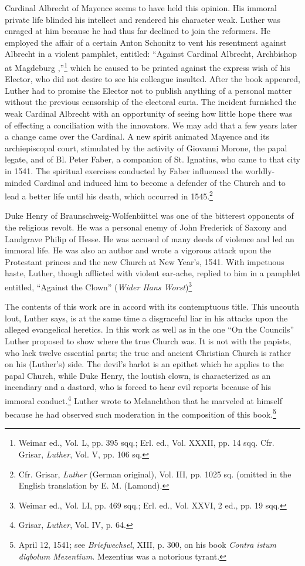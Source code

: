 Cardinal Albrecht of Mayence seems to have held this opinion.
His immoral private life blinded his intellect and rendered his character
weak. Luther was enraged at him because he had thus far declined
to join the reformers. He employed the affair of a certain
Anton Schonitz to vent his resentment against Albrecht in a violent
pamphlet, entitled: “Against Cardinal Albrecht, Archbishop at Magdeburg
,”\footnote
{Weimar ed., Vol. L, pp. 395 sqq.; Erl. ed., Vol. XXXII, pp. 14 sqq. Cfr. Grisar, \textit{Luther},
Vol. V, pp. 106 sq.}
which he caused to be printed against the express wish of
his Elector, who did not desire to see his colleague insulted. After the
book appeared, Luther had to promise the Elector not to publish anything
of a personal matter without the previous censorship of the
electoral curia. The incident furnished the weak Cardinal Albrecht
with an opportunity of seeing how little hope there was of effecting a
conciliation with the innovators. We may add that a few years later
a change came over the Cardinal. A new spirit animated Mayence and
its archiepiscopal court, stimulated by the activity of Giovanni Morone,
the papal legate, and of Bl. Peter Faber, a companion of St.
Ignatius, who came to that city in 1541. The spiritual exercises conducted
by Faber influenced the worldly-minded Cardinal and induced him to become
a defender of the Church and to lead a better
life until his death, which occurred in 1545.\footnote
{Cfr. Grisar, \textit{Luther} (German original), Vol. III, pp. 1025 sq. (omitted in the English
translation by E. M. (Lamond).}

Duke Henry of Braunschweig-Wolfenbiittel was one of the bitterest
opponents of the religious revolt. He was a personal enemy of
John Frederick of Saxony and Landgrave Philip of Hesse. He was
accused of many deeds of violence and led an immoral life. He was
also an author and wrote a vigorous attack upon the Protestant
princes and the new Church at New Year’s, 1541. With impetuous
haste, Luther, though afflicted with violent ear-ache, replied to him
in a pamphlet entitled, “Against the Clown” (\textit{Wider Hans Worst})\footnote{Weimar ed., Vol. LI, pp. 469 sqq.; Erl. ed., Vol. XXVI, 2 ed., pp. 19 sqq.}

The contents of this work are in accord with its contemptuous title.
This uncouth lout, Luther says, is at the same time a disgraceful liar
in his attacks upon the alleged evangelical heretics. In this work as
well as in the one “On the Councils” Luther proposed to show where
the true Church was. It is not with the papists, who lack twelve essential
parts; the true and ancient Christian Church is rather on his
(Luther’s) side. The devil’s harlot is an epithet which he applies to
the papal Church, while Duke Henry, the loutish clown, is characterized
as an incendiary and a dastard, who is forced to hear evil reports
because of his immoral conduct.\footnote{Grisar, \textit{Luther}, Vol. IV, p. 64.}
 Luther wrote to Melanchthon that
he marveled at himself because he had observed such moderation in
the composition of this book.\footnote
{April 12, 1541; see \textit{Briefwechsel}, XIII, p. 300, on his book \textit{Contra istum diqbolum Mezentium.}
Mezentius was a notorious tyrant.}

